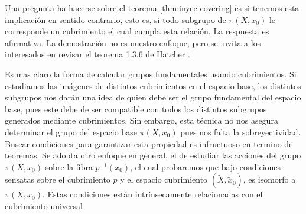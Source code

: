Una pregunta ha hacerse sobre el teorema \ref{thm:inyec-covering} es si
tenemos esta implicación en sentido contrario, esto es, si todo subgrupo
de \(\pi(X, x_0)\) le corresponde un cubrimiento el cual cumpla esta
relación. La respuesta es afirmativa. La demostración no es nuestro
enfoque, pero se invita a los interesados en revisar el teorema 1.3.6 de
Hatcher \cite{Hatcher}.

Es mas claro la forma de calcular grupos fundamentales usando
cubrimientos. Si estudiamos las imágenes de distintos cubrimientos en el
espacio base, los distintos subgrupos nos darán una idea de
quien debe ser el grupo fundamental del espacio base, pues este debe de
ser compatible con todos los distintos subgrupos generados mediante
cubrimientos. Sin embargo, esta técnica no nos asegura determinar el
grupo del espacio base \(\pi (X, x_0)\) pues nos falta la
sobreyectividad. Buscar condiciones para garantizar esta propiedad es
infructuoso en termino de teoremas. Se adopta otro enfoque en general,
el de estudiar las acciones del grupo \(\pi \left( X, x_0 \right)\)
sobre la fibra \(p^{-1} \left( x_0 \right)\), el cual probaremos que
bajo condiciones sensatas sobre el cubrimiento \(p\) y el espacio
cubrimiento \(\left( \tilde X, \tilde x _0 \right)\), es isomorfo a \(\pi
(X, x_0)\). Estas condiciones están intrínsecamente relacionadas con el
cubrimiento universal

